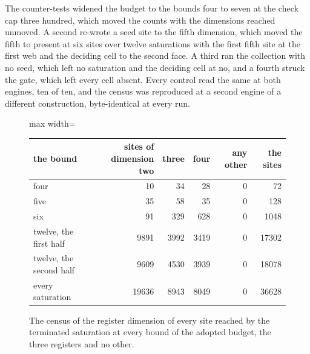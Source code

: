 \begin{chproof}
The counter-tests widened the budget to the bounds four to seven at the check cap three hundred, which moved the counts with the dimensions reached unmoved. A second re-wrote a seed site to the fifth dimension, which moved the fifth to present at six sites over twelve saturations with the first fifth site at the first web and the deciding cell to the second face. A third ran the collection with no seed, which left no saturation and the deciding cell at no, and a fourth struck the gate, which left every cell absent. Every control read the same at both engines, ten of ten, and the census was reproduced at a second engine of a different construction, byte-identical at every run.
\end{chproof}
\begin{figure}[h]\centering
\begin{adjustbox}{max width=\linewidth}\begin{tabular}{lrrrrr}\toprule
the bound & sites of dimension two & three & four & any other & the sites \\ \midrule
four & 10 & 34 & 28 & 0 & 72 \\
five & 35 & 58 & 35 & 0 & 128 \\
six & 91 & 329 & 628 & 0 & 1048 \\
twelve, the first half & 9891 & 3992 & 3419 & 0 & 17302 \\
twelve, the second half & 9609 & 4530 & 3939 & 0 & 18078 \\
every saturation & 19636 & 8943 & 8049 & 0 & 36628 \\ \bottomrule
\end{tabular}\end{adjustbox}
\caption{The census of the register dimension of every site reached by the terminated saturation at every bound of the adopted budget, the three registers and no other.}
\end{figure}


